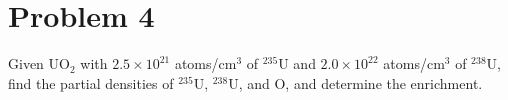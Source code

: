 \documentclass{report}
\begin{document}
\newpage
\section*{Problem 4}

Given UO$_2$ with $2.5 \times 10^{21}$ atoms/cm$^3$ of $^{235}$U and $2.0\times10^{22}$ atoms/cm$^3$ of $^{238}$U, find the partial densities of $^{235}$U, $^{238}$U, and O, and determine the enrichment.
\end{document}
